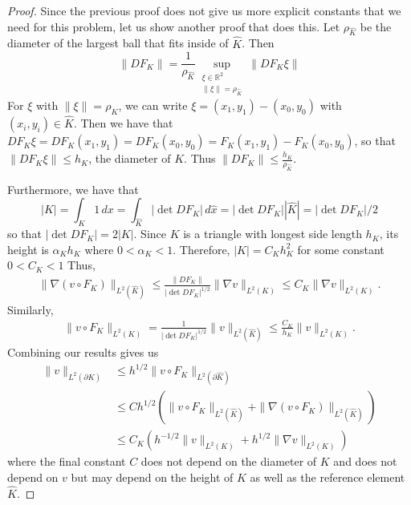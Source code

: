 \documentclass{article}
\theoremstyle{plain}
\begin{document}
\begin{proof}
	Since the previous proof does not give us more explicit constants that we need for this problem, let us show another proof that does this.
	Let $\rho_{\widehat K}$ be the diameter of the largest ball that fits inside of $\widehat K$.
	Then
	\begin{equation*}
		\|DF_K\| = \frac{1}{\rho_{\widehat K}}\sup_{\substack{\xi \in \mathbb R^2\\\|\xi\|=\rho_{\widehat K}}}\|DF_K\xi\|
	\end{equation*}
	For $\xi$ with $\|\xi\| = \rho_K$, we can write $\xi = (x_1,y_1) - (x_0,y_0)$ with $(x_i,y_i) \in \widehat K$.
	Then we have that $DF_K\xi = DF_K(x_1,y_1) = DF_K(x_0,y_0) = F_K(x_1,y_1) - F_K(x_0,y_0)$, so that $\|DF_K\xi\| \leq h_K$, the diameter of $K$.
	Thus $\|DF_K\| \leq \frac{h_K}{\rho_{\widehat K}}.$

	Furthermore, we have that
	\[|K| = \int_K1\,dx = \int_{\widehat K}|\det DF_K|\,d\widehat x = |\det DF_K||\widehat K| = |\det DF_K|/2\]
	so that $|\det DF_K| = 2|K|$.
	Since $K$ is a triangle with longest side length $h_K$, its height is $\alpha_Kh_K$ where $0 < \alpha_K < 1$.
	Therefore, $|K| = C_Kh_K^2$ for some constant $0 < C_K < 1$
	Thus,
	\begin{align*}
		\|\nabla (v\circ F_K)\|_{L^2(\widehat K)} \leq \frac{\|DF_K\|}{|\det DF_K|^{1/2}}\|\nabla v\|_{L^2(K)} \leq C_K\|\nabla v\|_{L^2(K)}.
	\end{align*}
	Similarly,
	\begin{align*}
		\|v\circ F_K\|_{L^2(K)} = \frac{1}{|\det DF_K|^{1/2}}\|v\|_{L^2(\widehat K)} \leq \frac{C_K}{h_K}\|v\|_{L^2(K)}.
	\end{align*}
	Combining our results gives us
	\begin{align*}
		\|v\|_{L^2(\partial K)} & \leq h^{1/2}\|v\circ F_K\|_{L^2(\partial\widehat K)}                                                  \\
		                        & \leq Ch^{1/2}\left(\|v\circ F_K\|_{L^2(\widehat K)} + \|\nabla(v\circ F_K)\|_{L^2(\widehat K)}\right) \\
		                        & \leq C_K\left(h^{-1/2}\|v\|_{L^2(K)} + h^{1/2}\|\nabla v\|_{L^2(K)}\right)
	\end{align*}
	where the final constant $C$ does not depend on the diameter of $K$ and does not depend on $v$ but may depend on the height of $K$ as well as the reference element $\widehat K$.

\end{proof}
\end{document}
